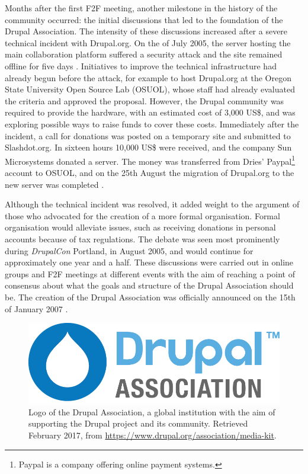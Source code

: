 Months after the first F2F meeting, another milestone in the history of the community occurred: the initial discussions that led to the foundation of the Drupal Association. The intensity of these discussions increased after a severe technical incident with Drupal.org. On the  of July 2005, the server hosting the main collaboration platform suffered a security attack and the site remained offline for five days \parencite{benjamin2011definitive}. Initiatives to improve the technical infrastructure had already begun before the attack, for example to host Drupal.org at the Oregon State University Open Source Lab (OSUOL), whose staff had already evaluated the criteria and approved the proposal. However, the Drupal community was required to provide the hardware, with an estimated cost of 3,000 US\$, and was exploring possible ways to raise funds to cover these costs. Immediately after the incident, a call for donations was posted on a temporary site and submitted to Slashdot.org. In sixteen hours 10,000 US\$ were received, and the company Sun Microsystems donated a server. The money was transferred from Dries' Paypal\footnote{Paypal is a company offering online payment systems.} account to OSUOL, and on the 25th August the migration of Drupal.org to the new server was completed \parencite{benjamin2011definitive}. 

Although the technical incident was resolved, it added weight to the argument of those who advocated for the creation of a more formal organisation. Formal organisation would alleviate issues, such as receiving donations in personal accounts because of tax regulations. The debate was seen most prominently during \textit{DrupalCon} Portland, in August 2005, and would continue for approximately one year and a half. These discussions were carried out in online groups and F2F meetings at different events with the aim of reaching a point of consensus about what the goals and structure of the Drupal Association should be. The creation of the Drupal Association was officially announced on the 15th of January 2007 \parencite{drupal-association-announcement:2013:Online}.

\begin{figure}[H]
	\centering
	\includegraphics[scale=0.65]{img/drupal_association.png}
	\caption[Logo of the Drupal Association]%
    {Logo of the Drupal Association, a global institution with the aim of supporting the Drupal project and its community. Retrieved  February 2017, from \url{https://www.drupal.org/association/media-kit}.}
	\label{drupal_association_logo}
\end{figure}

